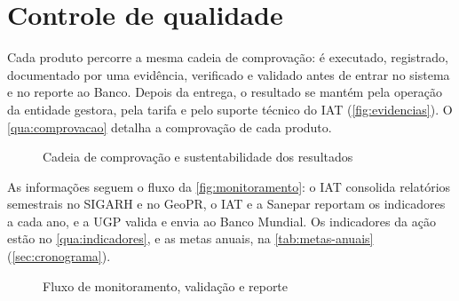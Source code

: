 \section{Controle de qualidade}
\label{sec:monitoramento}

Cada produto percorre a mesma cadeia de comprovação: é executado, registrado,
documentado por uma evidência, verificado e validado antes de entrar no
sistema e no reporte ao Banco. Depois da entrega, o resultado se mantém pela
operação da entidade gestora, pela tarifa e pelo suporte técnico do IAT
(\autoref{fig:evidencias}). O \autoref{qua:comprovacao} detalha a
comprovação de cada produto.

\begin{figure}[htbp]
  \centering
  \caption{Cadeia de comprovação e sustentabilidade dos resultados}
  \label{fig:evidencias}
\end{figure}


As informações seguem o fluxo da \autoref{fig:monitoramento}: o IAT consolida
relatórios semestrais no SIGARH e no GeoPR, o IAT e a Sanepar reportam os
indicadores a cada ano, e a UGP valida e envia ao Banco Mundial. Os
indicadores da ação estão no \autoref{qua:indicadores}, e as metas anuais, na
\autoref{tab:metas-anuais} (\autoref{sec:cronograma}).

\begin{figure}[htbp]
  \centering
  \caption{Fluxo de monitoramento, validação e reporte}
  \label{fig:monitoramento}
\end{figure}

